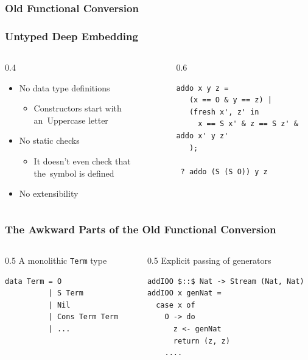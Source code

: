 \documentclass[xcolor={dvipsnames}, aspectratio=169]{beamer}
\begin{document}
\begin{frame}[fragile]
  \frametitle{Old Functional Conversion}

\end{frame}
\begin{frame}[fragile]
  \frametitle{Untyped Deep Embedding}
\begin{columns}
  \begin{column}{0.4\textwidth}
    \begin{itemize}
      \item No data type definitions 
      \begin{itemize}
        \item Constructors start with an~Uppercase letter
      \end{itemize}
      \item No static checks
      \begin{itemize}
        \item It doesn't even check that the~symbol is defined
      \end{itemize}
      \item No extensibility
    \end{itemize}
  \end{column}
  \begin{column}{0.6\textwidth}
\begin{lstlisting}[language=logic]
 addo x y z =
   (x == O & y == z) |
   (fresh x', z' in
     x == S x' & z == S z' & addo x' y z'
   );
 
 ? addo (S (S O)) y z
\end{lstlisting}
  \end{column}
\end{columns}
\end{frame}

\begin{frame}[fragile]
  \frametitle{The Awkward Parts of the Old Functional Conversion}
\begin{columns}
  \begin{column}[T]{0.5\textwidth}
A monolithic \lstinline{Term} type 
\vspace{0.5cm}

\begin{lstlisting}[language=ocanren1]
data Term = O 
          | S Term 
          | Nil 
          | Cons Term Term  
          | ...
\end{lstlisting} 
  \end{column}

  \pause

  \begin{column}[T]{0.5\textwidth}
    Explicit passing of generators 

\vspace{0.5cm}

\begin{lstlisting}[frame=tb, language=ocanren1]
addIOO $::$ Nat -> Stream (Nat, Nat)
addIOO x genNat =
  case x of
    O -> do
      z <- genNat
      return (z, z)
    ....
\end{lstlisting}
  \end{column}
\end{columns}
\end{frame}
\end{document}

